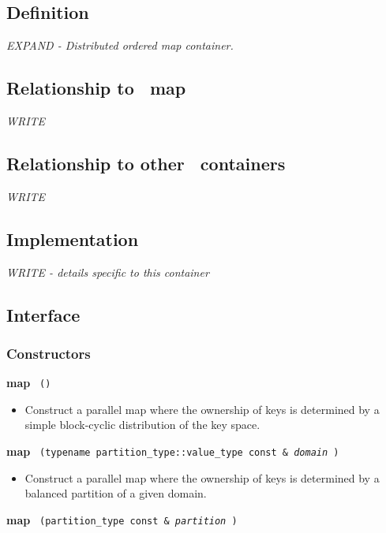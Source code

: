 \subsection{Definition}

\textit{EXPAND - Distributed ordered map container.}

\subsection{Relationship to \stl\ map}

\textit{WRITE}

\subsection{Relationship to other \stapl\ containers}

\textit{WRITE}

\subsection{Implementation}

\textit{WRITE - details specific to this container}

\subsection{Interface} \label{sec-map-cont-inter}

\subsubsection{Constructors}

\noindent
\textbf{map}%
\texttt{%
()
}

\begin{itemize}
\item
Construct a parallel map where the ownership of keys is determined by a simple block-cyclic distribution of the key space. 
\end{itemize}
 
\noindent
\textbf{map}%
\texttt{%
(typename partition\_type::value\_type const \&
\textit{domain}%
)
}

\begin{itemize}
\item
Construct a parallel map where the ownership of keys is determined by a balanced partition of a given domain. 
\end{itemize}
 
\noindent
\textbf{map}%
\texttt{%
(partition\_type const \&
\textit{partition}%
)
}


